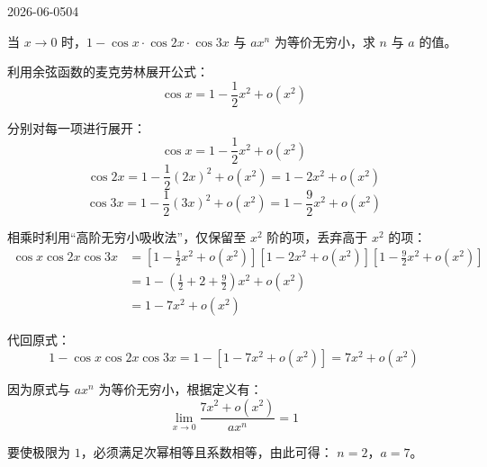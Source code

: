 \begin{mistake}{2026-06-05}{04}

\begin{problemcontent}
当 \(x \to 0\) 时，\(1 - \cos x \cdot \cos 2x \cdot \cos 3x\) 与 \(ax^n\) 为等价无穷小，求 \(n\) 与 \(a\) 的值。
\end{problemcontent}

\begin{solutioncontent}
利用余弦函数的麦克劳林展开公式：
\[\cos x = 1 - \frac{1}{2}x^2 + o(x^2)\]

分别对每一项进行展开：
\[\cos x = 1 - \frac{1}{2}x^2 + o(x^2)\]
\[\cos 2x = 1 - \frac{1}{2}(2x)^2 + o(x^2) = 1 - 2x^2 + o(x^2)\]
\[\cos 3x = 1 - \frac{1}{2}(3x)^2 + o(x^2) = 1 - \frac{9}{2}x^2 + o(x^2)\]

相乘时利用“高阶无穷小吸收法”，仅保留至 \(x^2\) 阶的项，丢弃高于 \(x^2\) 的项：
\[\begin{aligned}
\cos x \cos 2x \cos 3x &= \left[1 - \frac{1}{2}x^2 + o(x^2)\right]\left[1 - 2x^2 + o(x^2)\right]\left[1 - \frac{9}{2}x^2 + o(x^2)\right] \\
&= 1 - \left(\frac{1}{2} + 2 + \frac{9}{2}\right)x^2 + o(x^2) \\
&= 1 - 7x^2 + o(x^2)
\end{aligned}\]

代回原式：
\[1 - \cos x \cos 2x \cos 3x = 1 - [1 - 7x^2 + o(x^2)] = 7x^2 + o(x^2)\]

因为原式与 \(ax^n\) 为等价无穷小，根据定义有：
\[\lim_{x \to 0} \frac{7x^2 + o(x^2)}{ax^n} = 1\]

要使极限为 \(1\)，必须满足次幂相等且系数相等，由此可得：
\(n = 2\)，\(a = 7\)。
\end{solutioncontent}


\end{mistake}
